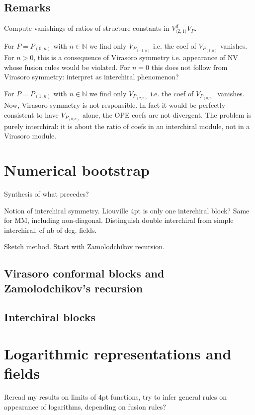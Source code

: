 \documentclass[12pt, a4paper]{article}
\theoremstyle{break}
\begin{document}
\subsection{Remarks}

Compute vanishings of ratios of structure constants in $V^d_{\langle 2,1\rangle}V_P$. 

For $P=P_{(0,n)}$ with $n\in\mathbb{N}$ we find only $V_{P_{(-1,n)}}$ i.e. the coef of $V_{P_{(1,n)}}$ vanishes. For $n>0$, this is a consequence of Virasoro symmetry i.e. appearance of NV whose fusion rules would be violated. For $n=0$ this does not follow from Virasoro symmetry: interpret as interchiral phenomenon?

For $P=P_{(1,n)}$ with $n\in\mathbb{N}$ we find only $V_{P_{(2,n)}}$ i.e. the coef of $V_{P_{(0,n)}}$ vanishes. Now, Virasoro symmetry is not responsible. In fact it would be perfectly consistent to have $V_{P_{(0,n)}}$ alone, the OPE coefs are not divergent. The problem is purely interchiral: it is about the ratio of coefs in an interchiral module, not in a Virasoro module. 

\section{Numerical bootstrap}

Synthesis of what precedes?

Notion of interchiral symmetry. Liouville 4pt is only one interchiral block? Same for MM, including non-diagonal. Distinguish double interchiral from simple interchiral, cf nb of deg. fields. 

Sketch method. Start with Zamolodchikov recursion.

\subsection{Virasoro conformal blocks and Zamolodchikov's recursion}

\subsection{Interchiral blocks} \label{sec:icb}


\section{Logarithmic representations and fields} \label{sec:log}

Reread my results on limits of 4pt functions, try to infer general rules on appearance of logarithms, depending on fusion rules?
\end{document}
